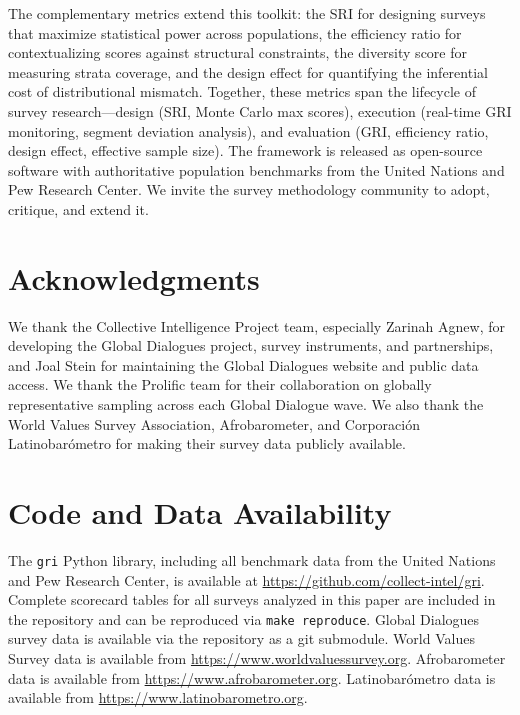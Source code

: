 \documentclass[11pt,a4paper]{article}
\begin{document}
The complementary metrics extend this toolkit: the SRI for designing surveys that maximize statistical power across populations, the efficiency ratio for contextualizing scores against structural constraints, the diversity score for measuring strata coverage, and the design effect for quantifying the inferential cost of distributional mismatch. Together, these metrics span the lifecycle of survey research---design (SRI, Monte Carlo max scores), execution (real-time GRI monitoring, segment deviation analysis), and evaluation (GRI, efficiency ratio, design effect, effective sample size). The framework is released as open-source software with authoritative population benchmarks from the United Nations and Pew Research Center. We invite the survey methodology community to adopt, critique, and extend it.

\section*{Acknowledgments}

We thank the Collective Intelligence Project team, especially Zarinah Agnew, for developing the Global Dialogues project, survey instruments, and partnerships, and Joal Stein for maintaining the Global Dialogues website and public data access. We thank the Prolific team for their collaboration on globally representative sampling across each Global Dialogue wave. We also thank the World Values Survey Association, Afrobarometer, and Corporaci\'{o}n Latinobar\'{o}metro for making their survey data publicly available.

\section*{Code and Data Availability}

The \texttt{gri} Python library, including all benchmark data from the United Nations and Pew Research Center, is available at \url{https://github.com/collect-intel/gri}. Complete scorecard tables for all surveys analyzed in this paper are included in the repository and can be reproduced via \texttt{make reproduce}. Global Dialogues survey data is available via the repository as a git submodule. World Values Survey data is available from \url{https://www.worldvaluessurvey.org}. Afrobarometer data is available from \url{https://www.afrobarometer.org}. Latinobar\'{o}metro data is available from \url{https://www.latinobarometro.org}.
\end{document}
